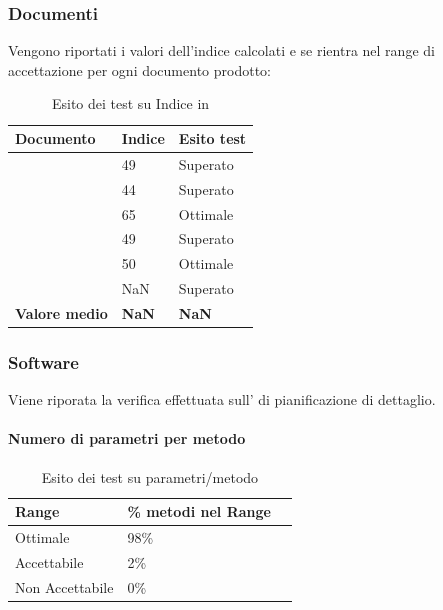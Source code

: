 \documentclass[12pt,a4paper]{article}
\begin{document}
\subsubsection{Documenti}
Vengono riportati i valori dell'indice  calcolati e se rientra nel range di accettazione per ogni documento prodotto:
\begin{table}[H]
	\begin{center}
		\begin{tabular}{p{} p{} p{}}
			\toprule
			\textbf{Documento}   & \textbf{Indice \mgls{gulpease}}	& \textbf{Esito test} \\ \midrule
			\midrule
			\NdP & 49 &  Superato \\ \midrule
			\SdF & 44 &  Superato \\ \midrule
			\AdR & 65 &  Ottimale \\ \midrule
			\PdP & 49 &  Superato \\ \midrule
			\PdQ & 50 &  Ottimale \\ \midrule
			\DP & NaN  &  Superato \\ \midrule \midrule
			\textbf{Valore medio} & \textbf{NaN}& \textbf{NaN}\\ 
			\bottomrule
		\end{tabular}
	\end{center}
	\caption{Esito dei test su Indice  in \FPD}
\end{table}

\subsubsection{Software}
Viene riporata la verifica effettuata sull'  di pianificazione di dettaglio. 
\paragraph{Numero di parametri per metodo}
\begin{table}[H]
	\begin{center}
		\begin{tabular}{p{} p{} p{}}
			\toprule
			\textbf{Range}   & \textbf{\% metodi nel Range}	 \\ \midrule
			\midrule
			Ottimale & 98\% \\ \midrule
			Accettabile & 2\%  \\ \midrule
			Non Accettabile  & 0\%  \\ \midrule
			\bottomrule
		\end{tabular}
	\end{center}
	\caption{Esito dei test su  parametri/metodo}
\end{table}
\end{document}

